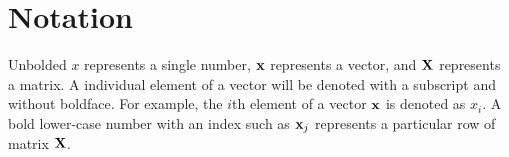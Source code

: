 
\inbpdocument

\chapter*{Notation}
\label{ch:notation}


Unbolded $x$ represents a single number, ${\bf{x}}$ represents a vector, and $\mathbf{X}$ represents a matrix.
A individual element of a vector will be denoted with a subscript and without boldface.
For example, the $i$th element of a vector ${\bf{x}}$ is denoted as $x_i$.
A bold lower-case number with an index such as ${\bf{x}}_j$ represents a particular row of matrix $\mathbf{X}$.

\vspace{1cm}

